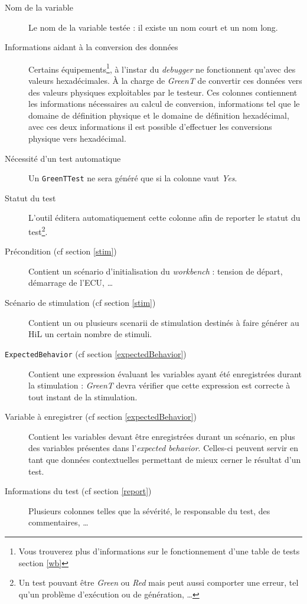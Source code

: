 \begin{description} 
	\item[Nom de la variable] Le nom de la variable testée : il existe un nom court et un nom long.
	\item[Informations aidant à la conversion des données] Certains équipements\footnote{Vous trouverez plus d'informations sur le fonctionnement d'une table de tests section \ref{wb}}, à l'instar du \textit{debugger} ne fonctionnent qu'avec des
	valeurs hexadécimales. À la charge de \textit{GreenT} de convertir ces données vers des valeurs physiques exploitables par
	le testeur. Ces colonnes contiennent les informations nécessaires au calcul de conversion, informations tel que le
		domaine de définition physique et le domaine de définition hexadécimal, avec ces deux informations il est possible d'effectuer les conversions physique vers hexadécimal.
	\item[Nécessité d'un test automatique] Un \texttt{GreenTTest} ne sera généré que si la colonne vaut \textit{Yes}.
	\item[Statut du test] L'outil éditera automatiquement cette colonne afin de reporter le statut du test\footnote{Un test pouvant être \textit{Green} ou \textit{Red}
		mais peut aussi comporter une erreur, tel qu'un problème d'exécution ou de génération, \ldots}.
	\item[Précondition (cf section \ref{stim})] Contient un scénario d'initialisation du \textit{workbench} : tension de départ,
	démarrage de l'ECU, \ldots
	\item[Scénario de stimulation (cf section \ref{stim})] Contient un ou plusieurs scenarii de stimulation destinés à faire générer au HiL un certain nombre de stimuli.
	\item[\texttt{ExpectedBehavior} (cf section \ref{expectedBehavior})] Contient une expression évaluant les variables ayant été enregistrées durant la stimulation : \textit{GreenT} devra vérifier que cette expression est correcte à tout instant de la stimulation.
	\item[Variable à enregistrer (cf section \ref{expectedBehavior})] Contient les variables devant être enregistrées durant un
	scénario, en plus des variables présentes dans l'\textit{expected behavior}. Celles-ci peuvent servir en tant que données
	contextuelles permettant de mieux cerner le résultat d'un test.
	\item[Informations du test (cf section \ref{report})] Plusieurs colonnes telles que la sévérité, le responsable du test, des commentaires, \ldots
\end{description}


